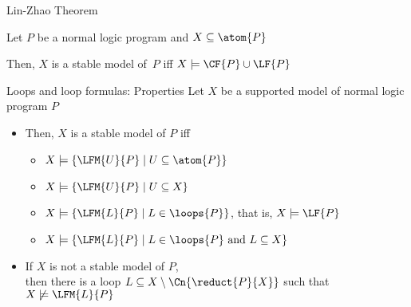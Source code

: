 \begin{frame}{Lin-Zhao Theorem}
\bigskip
\begin{theorem}
Let $P$ be a normal logic program and $X\subseteq\atom{P}$

Then, $X$ is a stable model of~$P$ iff $X\models\CF{P}\cup\LF{P}$
\end{theorem}
\end{frame}
\begin{frame}{Loops and loop formulas: Properties}
  \bigskip
  Let $X$ be a supported model of normal logic program $P$
  \medskip
  \begin{itemize}
  \item<2->  Then, $X$ is a stable model of $P$ iff
    \begin{itemize}
    \item $X\models\{  \LFM{U}{P} \mid U\subseteq\atom{P}  \}$
    \item $X\models\{  \LFM{U}{P} \mid U\subseteq X  \}$
    \item $X\models\{  \LFM{L}{P} \mid L\in\loops{P}  \}$, that is, $X\models\LF{P}$
    \item $X\models\{  \LFM{L}{P} \mid L\in\loops{P}\text{ and } L\subseteq X  \}$
    \end{itemize}
  \medskip
  \item<3-> 
    If $X$ is not a stable model of $P$,\\
    then there is a loop $L \subseteq X \setminus \Cn{\reduct{P}{X}}$
    such that $X \not\models \LFM{L}{P}$
  \end{itemize}
\end{frame}
